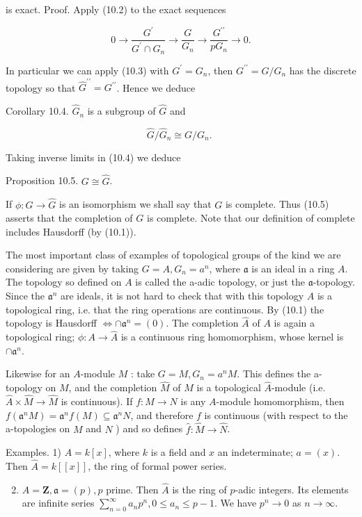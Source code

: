 \documentclass{standalone}
\theoremstyle{definition}
\theoremstyle{remark}
\begin{document}
is exact. Proof. Apply (10.2) to the exact sequences

\[
0 \rightarrow \frac{G^{\prime}}{G^{\prime} \cap G_{n}} \rightarrow \frac{G}{G_{n}} \rightarrow \frac{G^{\prime \prime}}{p G_{n}} \rightarrow 0 .
\]

In particular we can apply (10.3) with $G^{\prime}=G_{n}$, then $G^{\prime \prime}=G / G_{n}$ has the discrete topology so that $\hat{G}^{\prime \prime}=G^{\prime \prime}$. Hence we deduce

Corollary 10.4. $\hat{G}_{n}$ is a subgroup of $\hat{G}$ and

\[
\hat{G} / \hat{G}_{n} \cong G / G_{n} \text {. }
\]

Taking inverse limits in (10.4) we deduce

Proposition 10.5. $G \cong \hat{G}$.

If $\phi: G \rightarrow \hat{G}$ is an isomorphism we shall say that $G$ is complete. Thus (10.5) asserts that the completion of $G$ is complete. Note that our definition of complete includes Hausdorff (by (10.1)).

The most important class of examples of topological groups of the kind we are considering are given by taking $G=A, G_{n}=a^{n}$, where $\mathfrak{a}$ is an ideal in a ring $A$. The topology so defined on $A$ is called the a-adic topology, or just the $\mathfrak{a}$-topology. Since the $\mathfrak{a}^{n}$ are ideals, it is not hard to check that with this topology $A$ is a topological ring, i.e. that the ring operations are continuous. By (10.1) the topology is Hausdorff $\Leftrightarrow \cap \mathfrak{a}^{n}=(0)$. The completion $\hat{A}$ of $A$ is again a topological ring; $\phi: A \rightarrow \hat{A}$ is a continuous ring homomorphism, whose kernel is $\cap \mathfrak{a}^{n}$.

Likewise for an $A$-module $M$ : take $G=M, G_{n}=a^{n} M$. This defines the a-topology on $M$, and the completion $\hat{M}$ of $M$ is a topological $\hat{A}$-module (i.e. $\hat{A} \times \hat{M} \rightarrow \hat{M}$ is continuous). If $f: M \rightarrow N$ is any $A$-module homomorphism, then $f\left(\mathfrak{a}^{n} M\right)=\mathfrak{a}^{n} f(M) \subseteq \mathfrak{a}^{n} N$, and therefore $f$ is continuous (with respect to the a-topologies on $M$ and $N$ ) and so defines $\hat{f}: \hat{M} \rightarrow \hat{N}$.

Examples. 1) $A=k[x]$, where $k$ is a field and $x$ an indeterminate; $a=(x)$. Then $\hat{A}=k[[x]]$, the ring of formal power series.

\begin{enumerate}
  \setcounter{enumi}{1}
  \item $A=\mathbf{Z}, \mathfrak{a}=(p), p$ prime. Then $\hat{A}$ is the ring of $p$-adic integers. Its elements are infinite series $\sum_{n=0}^{\infty} a_{n} p^{n}, 0 \leqslant a_{n} \leqslant p-1$. We have $p^{n} \rightarrow 0$ as $n \rightarrow \infty$.
\end{enumerate}
\end{document}
